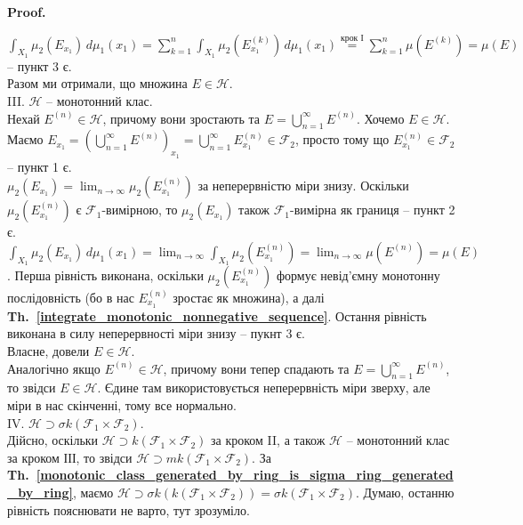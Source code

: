\documentclass[a4paper, 10pt]{article}
\makeatletter
\theoremstyle{theoremdd}
\newcommand\thref[1]{\textbf{Th.~\ref{#1}}}
\renewenvironment{proof}[1][Proof.\\]{\par
\pushQED{\hfill \qed}%
\normalfont \topsep6\p@\@plus6\p@\relax
\trivlist
\item\relax
{\bfseries
#1\@addpunct{.}}\hspace\labelsep\ignorespaces
}{%
\popQED\endtrivlist\@endpefalse
}
\makeatother
\begin{document}
\begin{proof}
$\displaystyle\int_{X_1} \mu_2(E_{x_1})\,d\mu_1(x_1) = \sum_{k=1}^n \int_{X_1} \mu_2\left( E^{(k)}_{x_1} \right)\,d\mu_1(x_1) \overset{\text{крок І}}{=} \sum_{k=1}^n \mu\left(E^{(k)}\right) = \mu(E)$ -- пункт 3 є.\\
Разом ми отримали, що множина $E \in \mathcal{H}$.
\bigskip \\
III. $\mathcal{H}$ -- монотонний клас.\\
Нехай $E^{(n)} \in \mathcal{H}$, причому вони зростають та $E = \displaystyle\bigcup_{n=1}^\infty E^{(n)}$. Хочемо $E \in \mathcal{H}$.\\
Маємо $E_{x_1} = \displaystyle \left( \bigcup_{n=1}^\infty E^{(n)} \right)_{x_1} = \bigcup_{n=1}^\infty E^{(n)}_{x_1} \in \mathcal{F}_2$, просто тому що $E_{x_1}^{(n)} \in \mathcal{F}_2$ -- пункт 1 є.\\
$\mu_2(E_{x_1}) = \displaystyle\lim_{n \to \infty} \mu_2\left(E_{x_1}^{(n)}\right)$ за неперервністю міри знизу. Оскільки $\mu_2\left(E_{x_1}^{(n)}\right)$ є $\mathcal{F}_1$-вимірною, то $\mu_2(E_{x_1})$ також $\mathcal{F}_1$-вимірна як границя -- пункт 2 є.\\
$\displaystyle\int_{X_1} \mu_2(E_{x_1})\,d\mu_1(x_1) = \lim_{n \to \infty} \int_{X_1} \mu_2\left(E_{x_1}^{(n)}\right) = \lim_{n \to \infty} \mu(E^{(n)}) = \mu(E)$. Перша рівність виконана, оскільки $\mu_2\left(E_{x_1}^{(n)}\right)$ формує невід'ємну монотонну послідовність (бо в нас $E_{x_1}^{(n)}$ зростає як множина), а далі \thref{integrate_monotonic_nonnegative_sequence}. Остання рівність виконана в силу неперервності міри знизу -- пукнт 3 є.\\
Власне, довели $E \in \mathcal{H}$.\\
Аналогічно якщо $E^{(n)} \in \mathcal{H}$, причому вони тепер спадають та $E = \displaystyle\bigcup_{n=1}^\infty E^{(n)}$, то звідси $E \in \mathcal{H}$. Єдине там використовується неперервність міри зверху, але міри в нас скінченні, тому все нормально.
\bigskip \\
IV. $\mathcal{H} \supset \sigma k(\mathcal{F}_1 \times \mathcal{F}_2)$.\\
Дійсно, оскільки $\mathcal{H} \supset k(\mathcal{F}_1 \times \mathcal{F}_2)$ за кроком II, а також $\mathcal{H}$ -- монотонний клас за кроком ІІІ, то звідси $\mathcal{H} \supset mk(\mathcal{F}_1 \times \mathcal{F}_2)$. За \thref{monotonic_class_generated_by_ring_is_sigma_ring_generated_by_ring}, маємо $\mathcal{H} \supset \sigma k (k (\mathcal{F}_1 \times \mathcal{F}_2)) = \sigma k(\mathcal{F}_1 \times \mathcal{F}_2)$. Думаю, останню рівність пояснювати не варто, тут зрозуміло.

\end{proof}
\end{document}
